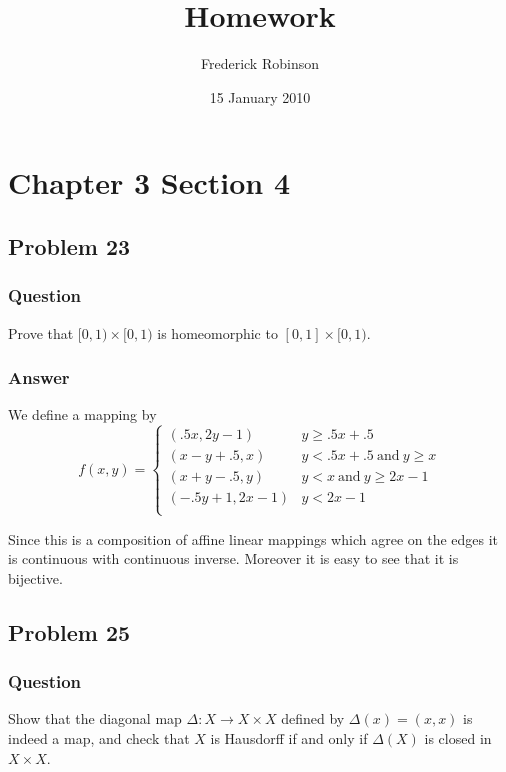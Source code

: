 \documentclass[10pt]{article}
\title{Homework}
\author{Frederick Robinson}
\date{15 January 2010}
\begin{document}

   \maketitle



\section{Chapter 3 Section 4}

\subsection{Problem 23}

\subsubsection{Question}
Prove that $[0,1) \times [0,1)$ is homeomorphic to $[0,1] \times [0,1)$.
\subsubsection{Answer}
We define a mapping by 
\[f(x,y) = \left\{\begin{array}{lr}
(.5 x,2y-1 ) & y\geq .5 x +.5\\
(x-y+.5,x ) & y < .5 x +.5 \mathrm{\ and\ } y \geq x\\
(x+y-.5,y)& y< x \mathrm{\ and\ } y \geq 2x -1\\
(-.5y+1,2x-1)&  y < 2x -1\\


\end{array}
\right.
\]

Since this is a composition of affine linear mappings which agree on the edges it is continuous with continuous inverse. Moreover it is easy to see that it is bijective.

\subsection{Problem 25}

\subsubsection{Question}
Show that the diagonal map $\Delta: X \to X \times X $ defined by $\Delta(x) = (x,x)$ is indeed a map, and check that $X$ is Hausdorff if and only if $\Delta(X )$ is closed in $X \times X$.
\end{document}
